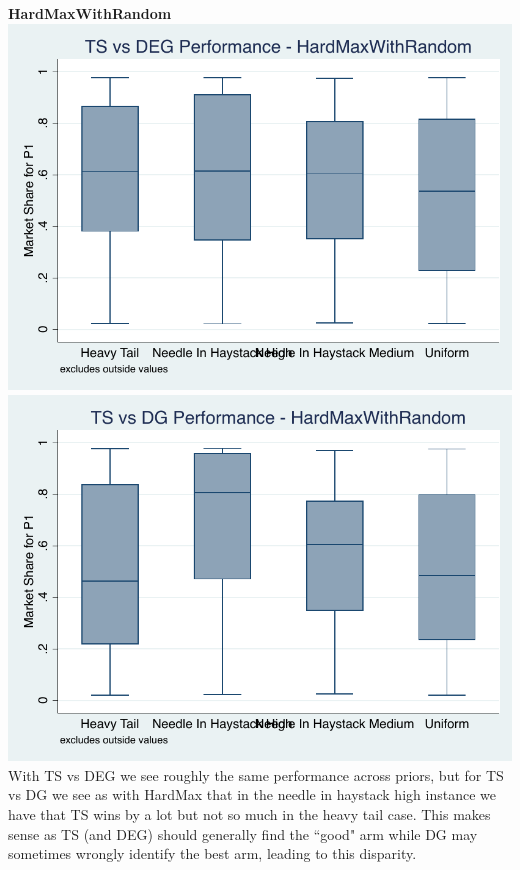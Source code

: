 \documentclass[11pt,letterpaper]{article}
\begin{document}
\pagebreak
\textbf{HardMaxWithRandom} \\
\includegraphics[scale=0.9]{hmr_ts_deg_prior} \\
\includegraphics[scale=0.9]{hmr_ts_dg_prior} \\
With TS vs DEG we see roughly the same performance across priors, but for TS vs DG we see as with HardMax that in the needle in haystack high instance we have that TS wins by a lot but not so much in the heavy tail case. This makes sense as TS (and DEG) should generally find the ``good" arm while DG may sometimes wrongly identify the best arm, leading to this disparity.
\end{document}
